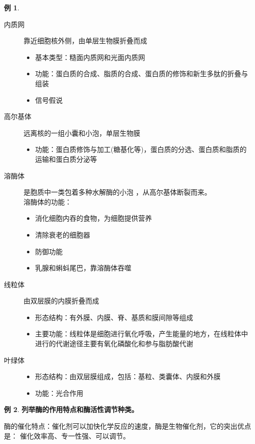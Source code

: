 \documentclass[UTF8]{article}
\theoremstyle{definition}
\newtheorem{example}{例}[section]
\begin{document}
\begin{example}
    \begin{description}
        \item[内质网] 靠近细胞核外侧，由单层生物膜折叠而成\begin{itemize}
            \item 基本类型：糙面内质网和光面内质网
            \item 功能：蛋白质的合成、脂质的合成、蛋白质的修饰和新生多肽的折叠与组装
            \item 信号假说
        \end{itemize}
        \item[高尔基体] 远离核的一组小囊和小泡，单层生物膜\begin{itemize}
            \item 功能：蛋白质修饰与加工(糖基化等)，蛋白质的分选、蛋白质和脂质的运输和蛋白质分泌等
        \end{itemize}
        \item[溶酶体] 是胞质中一类包着多种水解酶的小泡 ，从高尔基体断裂而来。\\ 溶酶体的功能：\begin{itemize}
            \item 消化细胞内吞的食物，为细胞提供营养\item 清除衰老的细胞器\item 防御功能\item 乳腺和蝌蚪尾巴，靠溶酶体吞噬
        \end{itemize}
        \item[线粒体] 由双层膜的内膜折叠而成\begin{itemize}
            \item 形态结构：有外膜、内膜、脊、基质和膜间隙等组成
            \item 主要功能：线粒体是细胞进行氧化呼吸，产生能量的地方，在线粒体中进行的代谢途径主要有氧化磷酸化和参与脂肪酸代谢
        \end{itemize}
        \item[叶绿体] \begin{itemize}
            \item 形态结构：由双层膜组成，包括：基粒、类囊体、内膜和外膜
            \item 功能：光合作用
        \end{itemize}
    \end{description}
\end{example}\begin{example}\textbf{列举酶的作用特点和酶活性调节种类。}

    酶的催化特点：催化剂可以加快化学反应的速度，酶是生物催化剂，它的突出优点是： 催化效率高、专一性强、可以调节。
    

\end{example}
\end{document}
